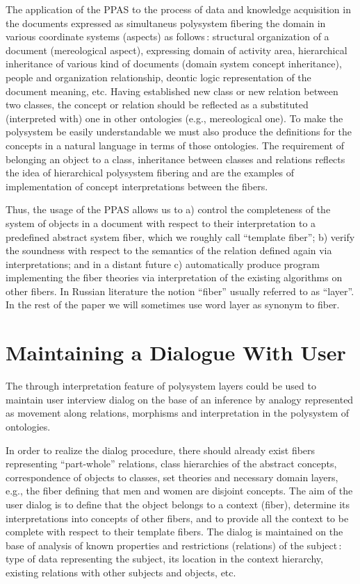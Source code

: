 \documentclass[conference]{IEEEtran}
\begin{document}
The application of the PPAS to the process of data and knowledge
acquisition in the documents expressed as simultaneus polysystem
fibering the domain in various coordinate systems (aspects) as
follows\,: structural organization of a document (mereological
aspect), expressing domain of activity area, hierarchical inheritance
of various kind of documents (domain system concept inheritance),
people and organization relationship, deontic logic representation of
the document meaning, etc.  Having established new class or new
relation between two classes, the concept or relation should be
reflected as a substituted (interpreted with) one in other ontologies
(e.g., mereological one).  To make the polysystem be easily
understandable we must also produce the definitions for the concepts
in a natural language in terms of those ontologies.  The requirement
of belonging an object to a class, inheritance between classes and
relations reflects the idea of hierarchical polysystem fibering and
are the examples of implementation of concept interpretations between
the fibers.

Thus, the usage of the PPAS allows us to a) control the completeness
of the system of objects in a document with respect to their
interpretation to a predefined abstract system fiber, which we roughly
call ``template fiber''; b) verify the soundness with respect to the
semantics of the relation defined again via interpretations; and in a
distant future c) automatically produce program implementing the fiber
theories via interpretation of the existing algorithms on other
fibers.  In Russian literature the notion ``fiber'' usually referred
to as ``layer''.  In the rest of the paper we will sometimes use word
layer as synonym to fiber.

\section{Maintaining a Dialogue With User}

The through interpretation feature of polysystem layers could be used
to maintain user interview dialog on the base of an inference by
analogy represented as movement along relations, morphisms and
interpretation in the polysystem of ontologies.

In order to realize the dialog procedure, there should already exist
fibers representing ``part-whole'' relations, class hierarchies of the
abstract concepts, correspondence of objects to classes, set theories
and necessary domain layers, e.g., the fiber defining that men and
women are disjoint concepts.  The aim of the user dialog is to define
that the object belongs to a context (fiber), determine its
interpretations into concepts of other fibers, and to provide all the
context to be complete with respect to their template fibers.  The
dialog is maintained on the base of analysis of known properties and
restrictions (relations) of the subject\,: type of data representing
the subject, its location in the context hierarchy, existing relations
with other subjects and objects, etc.
\end{document}
